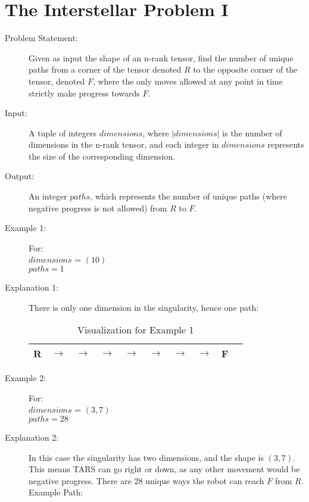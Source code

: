 \section{The Interstellar Problem I}
\begin{description}
    \item[Problem Statement:]
    Given as input the shape of an n-rank tensor, find the number of unique paths from a corner of the tensor denoted $R$ to the opposite corner of the tensor,
    denoted $F$, where the only moves allowed at any point in time strictly make progress towards $F$.
        
    \item[Input:]
    A tuple of integers $dimensions$, where $|dimensions|$ is the number of dimensions in the n-rank tensor, and each integer in $dimensions$ represents the size of the corresponding dimension.
        
    \item[Output:] 
    An integer $paths$, which represents the number of unique paths (where negative progress is not allowed) from $R$ to $F$.
        
    \item[Example 1:] For:\\
    $dimensions$ = $(10)$\\
    $paths = 1$
    \item[Explanation 1:]
    There is only one dimension in the singularity, hence one path:
    \begin{table}[H]
        \centering
        \begin{tabular}{|c|c|c|c|c|c|c|c|c|c|}
            \hline
            \textbf{R} & $\rightarrow$ & $\rightarrow$ &$\rightarrow$ & $\rightarrow$ & $\rightarrow$& $\rightarrow$&$\rightarrow$ & \textbf{F} \\
            \hline
        \end{tabular}
        \caption{Visualization for Example 1}
    \end{table}

    \item[Example 2:] For:\\
    $dimensions$ = $(3,7)$\\
    $paths = 28$

    \item[Explanation 2:]
    In this case the singularity has two dimensions, and the shape is $(3,7)$. This means TARS can go right or down, as any other movement would be negative progress.
    There are 28 unique ways the robot can reach $F$ from $R$.
    Example Path:


\end{description}
